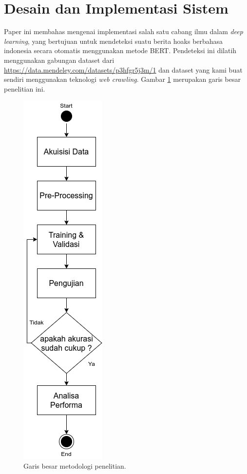 \section{Desain dan Implementasi Sistem}
\label{sec:desainimplementasi}

Paper ini membahas mengenai implementasi salah satu cabang ilmu dalam \textit{deep learning}, yang bertujuan untuk mendeteksi suatu berita hoaks berbahasa indonesia secara otomatis menggunakan metode BERT. Pendeteksi ini dilatih menggunakan gabungan dataset dari \url{https://data.mendeley.com/datasets/p3hfgr5j3m/1} dan dataset yang kami buat sendiri menggunakan teknologi \textit{web crawling}. Gambar \ref{fig:metodologi} merupakan garis besar penelitian ini.

\begin{figure} [ht]
    \centering
    \includegraphics[width=0.3\columnwidth]{gambar/metodologi_vertical.png}
    \caption{Garis besar metodologi penelitian.}
    \label{fig:metodologi}
\end{figure}

